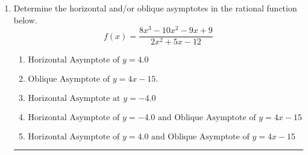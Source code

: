\documentclass[14pt]{extbook}
\newcommand{\litem}[1]{\item#1\hspace*{-1cm}\rule{\textwidth}{0.4pt}}
\begin{document}
\begin{enumerate}
{\begin{enumerate}[label=\Alph*.]
\end{enumerate} }
\litem{
Determine the horizontal and/or oblique asymptotes in the rational function below.\[ f(x) = \frac{8x^{3} -10 x^{2} -9 x + 9}{2x^{2} +5 x -12} \]\begin{enumerate}[label=\Alph*.]
\item \( \text{Horizontal Asymptote of } y = 4.0  \)
\item \( \text{Oblique Asymptote of } y = 4x -15. \)
\item \( \text{Horizontal Asymptote at } y = -4.0 \)
\item \( \text{Horizontal Asymptote of } y = -4.0 \text{ and Oblique Asymptote of } y = 4x -15 \)
\item \( \text{Horizontal Asymptote of } y = 4.0 \text{ and Oblique Asymptote of } y = 4x -15 \)

\end{enumerate} }
\end{enumerate}
\end{document}
